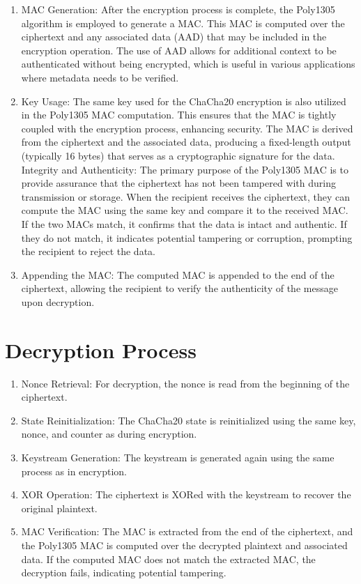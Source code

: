 \documentclass[a4paper,12pt]{report}
\begin{document}
\begin{enumerate}
        \item MAC Generation: After the encryption process is complete, the Poly1305 algorithm is employed to generate a MAC.
        This MAC is computed over the ciphertext and any associated data (AAD) that may be included in the encryption operation.
        The use of AAD allows for additional context to be authenticated without being encrypted, which is useful in various applications where metadata needs to be verified.
        \item Key Usage: The same key used for the ChaCha20 encryption is also utilized in the Poly1305 MAC computation.
        This ensures that the MAC is tightly coupled with the encryption process, enhancing security.
        The MAC is derived from the ciphertext and the associated data, producing a fixed-length output (typically 16 bytes) that serves as a cryptographic signature for the data.
        Integrity and Authenticity: The primary purpose of the Poly1305 MAC is to provide assurance that the ciphertext has not been tampered with during transmission or storage.
        When the recipient receives the ciphertext, they can compute the MAC using the same key and compare it to the received MAC.
        If the two MACs match, it confirms that the data is intact and authentic.
        If they do not match, it indicates potential tampering or corruption, prompting the recipient to reject the data.
       \item Appending the MAC: The computed MAC is appended to the end of the ciphertext, allowing the recipient to verify the authenticity of the message upon decryption.
\end{enumerate}

\section{Decryption Process}
\begin{enumerate}
    \item Nonce Retrieval: For decryption, the nonce is read from the beginning of the ciphertext.
    \item State Reinitialization: The ChaCha20 state is reinitialized using the same key, nonce, and counter as during encryption.
    \item Keystream Generation: The keystream is generated again using the same process as in encryption.
    \item XOR Operation: The ciphertext is XORed with the keystream to recover the original plaintext.
    \item MAC Verification: The MAC is extracted from the end of the ciphertext, and the Poly1305 MAC is computed over the decrypted plaintext and associated data.
    If the computed MAC does not match the extracted MAC, the decryption fails, indicating potential tampering.
\end{enumerate}
\end{document}

